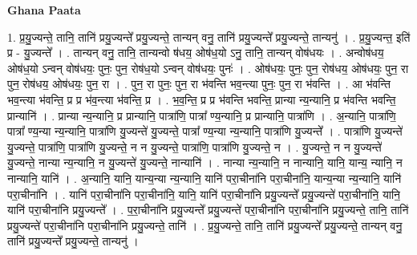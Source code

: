 \documentclass[17pt]{extarticle}
\begin{document}
\textbf{Ghana Paata } \newline

1. प्र॒यु॒ज्यन्ते॒ तानि॒ तानि॑ प्रयु॒ज्यन्ते᳚ प्रयु॒ज्यन्ते॒ तान्यन् वनु॒ तानि॑ प्रयु॒ज्यन्ते᳚ प्रयु॒ज्यन्ते॒ तान्यनु॑ । . प्र॒यु॒ज्यन्त॒ इति॑ प्र - यु॒ज्यन्ते᳚ । . तान्यन् वनु॒ तानि॒ तान्यन्वो ष॑धय॒ ओष॑ध॒यो ऽनु॒ तानि॒ तान्यन् वोष॑धयः । . अन्वोष॑धय॒ ओष॑ध॒यो ऽन्वन् वोष॑धयः॒ पुनः॒ पुन॒ रोष॑ध॒यो ऽन्वन् वोष॑धयः॒ पुनः॑ । . ओष॑धयः॒ पुनः॒ पुन॒ रोष॑धय॒ ओष॑धयः॒ पुन॒ रा पुन॒ रोष॑धय॒ ओष॑धयः॒ पुन॒ रा । . पुन॒ रा पुनः॒ पुन॒ रा भ॑वन्ति भव॒न्त्या पुनः॒ पुन॒ रा भ॑वन्ति । . आ भ॑वन्ति भव॒न्त्या भ॑वन्ति॒ प्र प्र भ॑व॒न्त्या भ॑वन्ति॒ प्र । . भ॒व॒न्ति॒ प्र प्र भ॑वन्ति भवन्ति॒ प्रान्या न्य॒न्यानि॒ प्र भ॑वन्ति भवन्ति॒ प्रान्यानि॑ । . प्रान्या न्य॒न्यानि॒ प्र प्रान्यानि॒ पात्रा॑णि॒ पात्रा᳚ ण्य॒न्यानि॒ प्र प्रान्यानि॒ पात्रा॑णि । . अ॒न्यानि॒ पात्रा॑णि॒ पात्रा᳚ ण्य॒न्या न्य॒न्यानि॒ पात्रा॑णि यु॒ज्यन्ते॑ यु॒ज्यन्ते॒ पात्रा᳚ ण्य॒न्या न्य॒न्यानि॒ पात्रा॑णि यु॒ज्यन्ते᳚ । . पात्रा॑णि यु॒ज्यन्ते॑ यु॒ज्यन्ते॒ पात्रा॑णि॒ पात्रा॑णि यु॒ज्यन्ते॒ न न यु॒ज्यन्ते॒ पात्रा॑णि॒ पात्रा॑णि यु॒ज्यन्ते॒ न । . यु॒ज्यन्ते॒ न न यु॒ज्यन्ते॑ यु॒ज्यन्ते॒ नान्या न्य॒न्यानि॒ न यु॒ज्यन्ते॑ यु॒ज्यन्ते॒ नान्यानि॑ । . नान्या न्य॒न्यानि॒ न नान्यानि॒ यानि॒ यान्य॒ न्यानि॒ न नान्यानि॒ यानि॑ । . अ॒न्यानि॒ यानि॒ यान्य॒न्या न्य॒न्यानि॒ यानि॑ परा॒चीना॑नि परा॒चीना॑नि॒ यान्य॒न्या न्य॒न्यानि॒ यानि॑ परा॒चीना॑नि । . यानि॑ परा॒चीना॑नि परा॒चीना॑नि॒ यानि॒ यानि॑ परा॒चीना॑नि प्रयु॒ज्यन्ते᳚ प्रयु॒ज्यन्ते॑ परा॒चीना॑नि॒ यानि॒ यानि॑ परा॒चीना॑नि प्रयु॒ज्यन्ते᳚ । . प॒रा॒चीना॑नि प्रयु॒ज्यन्ते᳚ प्रयु॒ज्यन्ते॑ परा॒चीना॑नि परा॒चीना॑नि प्रयु॒ज्यन्ते॒ तानि॒ तानि॑ प्रयु॒ज्यन्ते॑ परा॒चीना॑नि परा॒चीना॑नि प्रयु॒ज्यन्ते॒ तानि॑ । . प्र॒यु॒ज्यन्ते॒ तानि॒ तानि॑ प्रयु॒ज्यन्ते᳚ प्रयु॒ज्यन्ते॒ तान्यन् वनु॒ तानि॑ प्रयु॒ज्यन्ते᳚ प्रयु॒ज्यन्ते॒ तान्यनु॑ । \newline
\end{document}
